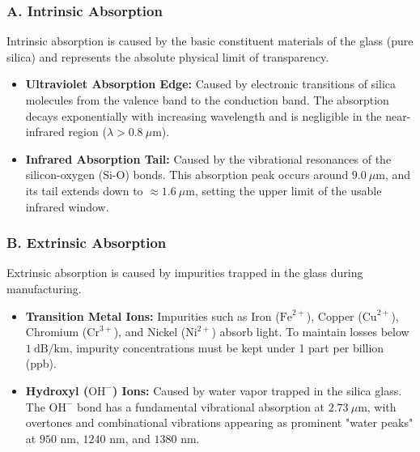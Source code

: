 \subsubsection{A. Intrinsic Absorption}
Intrinsic absorption is caused by the basic constituent materials of the glass (pure silica) and represents the absolute physical limit of transparency.
\begin{itemize}
  \item   \textbf{Ultraviolet Absorption Edge:} Caused by electronic transitions of silica molecules from the valence band to the conduction band. The absorption decays exponentially with increasing wavelength and is negligible in the near-infrared region ($\lambda > 0.8\ \mu\text{m}$).
  \item   \textbf{Infrared Absorption Tail:} Caused by the vibrational resonances of the silicon-oxygen ($\text{Si-O}$) bonds. This absorption peak occurs around $9.0\ \mu\text{m}$, and its tail extends down to $\approx 1.6\ \mu\text{m}$, setting the upper limit of the usable infrared window.
\end{itemize}

\subsubsection{B. Extrinsic Absorption}
Extrinsic absorption is caused by impurities trapped in the glass during manufacturing.
\begin{itemize}
  \item   \textbf{Transition Metal Ions:} Impurities such as Iron ($\text{Fe}^{2+}$), Copper ($\text{Cu}^{2+}$), Chromium ($\text{Cr}^{3+}$), and Nickel ($\text{Ni}^{2+}$) absorb light. To maintain losses below $1\ \text{dB/km}$, impurity concentrations must be kept under 1 part per billion (ppb).
  \item   \textbf{Hydroxyl ($\text{OH}^-$) Ions:} Caused by water vapor trapped in the silica glass. The $\text{OH}^-$ bond has a fundamental vibrational absorption at $2.73\ \mu\text{m}$, with overtones and combinational vibrations appearing as prominent "water peaks" at $950\text{ nm}$, $1240\text{ nm}$, and $1380\text{ nm}$.
\end{itemize}

